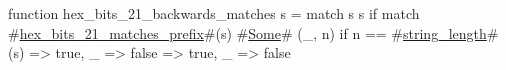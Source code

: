 function hex_bits_21_backwards_matches s = match s {
  s if match #\hyperref[sailRISCVzhexzybitszy21zymatcheszyprefix]{hex\_bits\_21\_matches\_prefix}#(s) {
    #\hyperref[sailRISCVzSome]{Some}# (_, n) if n == #\hyperref[sailRISCVzstringzylength]{string\_length}#(s) => true,
    _ => false
  } => true,
  _ => false
}

